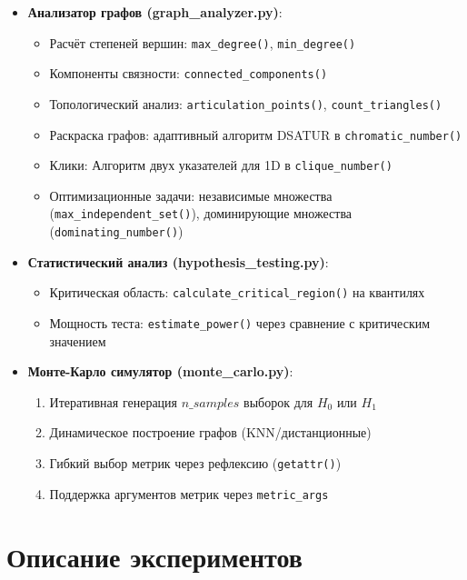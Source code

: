 \documentclass[a4paper, 12pt]{article}
\begin{document}
\begin{itemize}
    \item \textbf{Анализатор графов (graph\_analyzer.py)}:
    \begin{itemize}
        \item Расчёт степеней вершин: \texttt{max\_degree()}, \texttt{min\_degree()}
        \item Компоненты связности: \texttt{connected\_components()}
        \item Топологический анализ: \texttt{articulation\_points()}, \texttt{count\_triangles()}
        \item Раскраска графов: адаптивный алгоритм DSATUR в \texttt{chromatic\_number()}
        \item Клики: Алгоритм двух указателей для 1D в \texttt{clique\_number()}
        \item Оптимизационные задачи: независимые множества (\texttt{max\_independent\_set()}), доминирующие множества (\texttt{dominating\_number()})
    \end{itemize}
    
    \item \textbf{Статистический анализ (hypothesis\_testing.py)}:
    \begin{itemize}
        \item Критическая область: \texttt{calculate\_critical\_region()} на квантилях
        \item Мощность теста: \texttt{estimate\_power()} через сравнение с критическим значением
    \end{itemize}
    
    \item \textbf{Монте-Карло симулятор (monte\_carlo.py)}:
    \begin{enumerate}
        \item Итеративная генерация \(n\_samples\) выборок для \(H_0\) или \(H_1\)
        \item Динамическое построение графов (KNN/дистанционные)
        \item Гибкий выбор метрик через рефлексию (\texttt{getattr()})
        \item Поддержка аргументов метрик через \texttt{metric\_args}
    \end{enumerate}
\end{itemize}

\section{Описание экспериментов}
\end{document}
